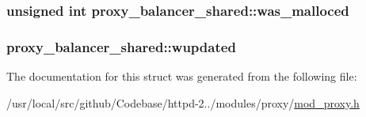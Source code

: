 \subsubsection[{\texorpdfstring{was\+\_\+malloced}{was_malloced}}]{\setlength{\rightskip}{0pt plus 5cm}unsigned {\bf int} proxy\+\_\+balancer\+\_\+shared\+::was\+\_\+malloced}\hypertarget{structproxy__balancer__shared_accdb8cedf933a6172e230ce712917726}{}\label{structproxy__balancer__shared_accdb8cedf933a6172e230ce712917726}
\subsubsection[{\texorpdfstring{wupdated}{wupdated}}]{ proxy\+\_\+balancer\+\_\+shared\+::wupdated}\hypertarget{structproxy__balancer__shared_afaee203e8fe07a489135a745ee96deba}{}\label{structproxy__balancer__shared_afaee203e8fe07a489135a745ee96deba}


The documentation for this struct was generated from the following file\+:\begin{DoxyCompactItemize}
\item 
/usr/local/src/github/\+Codebase/httpd-\/2../modules/proxy/\hyperlink{mod__proxy_8h}{mod\+\_\+proxy.\+h}\end{DoxyCompactItemize}

